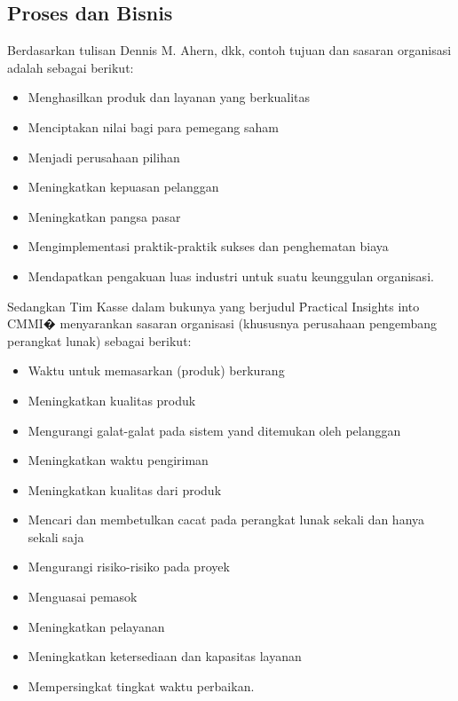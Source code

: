 \subsection{Proses dan Bisnis}
Berdasarkan tulisan Dennis M. Ahern, dkk\cite{reqm.distilled}, contoh tujuan dan sasaran organisasi adalah sebagai berikut:
\begin{itemize}
	\item Menghasilkan produk dan layanan yang berkualitas
	\item Menciptakan nilai bagi para pemegang saham
	\item Menjadi perusahaan pilihan
	\item Meningkatkan kepuasan pelanggan
	\item Meningkatkan pangsa pasar
	\item Mengimplementasi praktik-praktik sukses dan penghematan biaya
	\item Mendapatkan pengakuan luas industri untuk suatu keunggulan organisasi.
\end{itemize}
Sedangkan Tim Kasse dalam bukunya yang berjudul \f{Practical Insights into CMMI�} menyarankan sasaran organisasi (khususnya perusahaan pengembang perangkat lunak) sebagai berikut\cite{reqm.practical}:
\begin{itemize}
	\item Waktu untuk memasarkan (produk) berkurang
	\item Meningkatkan kualitas produk
	\item Mengurangi galat-galat pada sistem yand ditemukan oleh pelanggan
	\item Meningkatkan waktu pengiriman
	\item Meningkatkan kualitas dari produk
	\item Mencari dan membetulkan cacat pada perangkat lunak sekali dan hanya sekali saja
	\item Mengurangi risiko-risiko pada proyek
	\item Menguasai pemasok
	\item Meningkatkan pelayanan
	\item Meningkatkan ketersediaan dan kapasitas layanan
	\item Mempersingkat tingkat waktu perbaikan.
\end{itemize}

